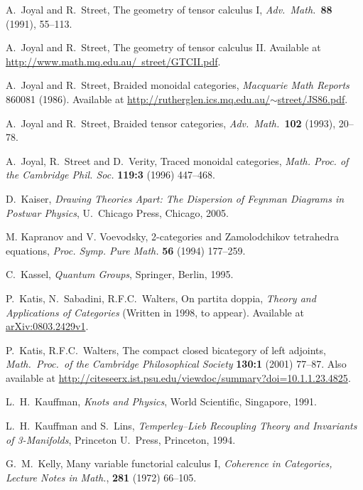 \documentclass[12pt,twoside,openright]{report}
\begin{document}
\begin{thebibliography}{99}
A.\ Joyal and R.\ Street, The geometry of tensor calculus I, 
{\sl Adv.\ Math.\ }{\bf 88} (1991), 55--113.

A.\ Joyal and R.\ Street, The geometry of tensor calculus II. Available at
\hfill \break
\href{http://www.math.mq.edu.au/~street/GTCII.pdf}
{http://www.math.mq.edu.au/~street/GTCII.pdf}.

 A.\ Joyal and R.\ Street, Braided monoidal categories,
{\sl Macquarie Math Reports} 860081 (1986).  Available at
\href{http://rutherglen.ics.mq.edu.au/~street/JS86.pdf}{
http://rutherglen.ics.mq.edu.au/$\sim$street/JS86.pdf}.

A.\ Joyal and R.\ Street, Braided tensor categories,
\textsl{Adv.\ Math.\ }\textbf{102} (1993), 20--78.

 A.\ Joyal, R.\ Street and D.\ Verity, Traced monoidal categories, \textsl{Math. Proc. of the Cambridge Phil. Soc.} \textbf{119:3} (1996) 447--468.

D.\ Kaiser, \textsl{Drawing Theories Apart: The Dispersion of Feynman Diagrams in Postwar Physics}, U.\ Chicago Press, Chicago, 2005.

 M. Kapranov and V. Voevodsky, 2-categories and Zamolodchikov tetrahedra equations, \textsl{Proc. Symp. Pure Math.} \textbf{56} (1994) 177--259.

C.\ Kassel, \textsl{Quantum Groups}, Springer, Berlin, 1995.

 P.\ Katis, N.\ Sabadini, R.F.C.\ Walters, On partita doppia, \textsl{Theory and Applications of Categories} (Written in 1998, to appear).  Available at \href{http://arxiv.org/abs/0803.2429}{arXiv:0803.2429v1}.

 P.\ Katis, R.F.C.\ Walters, The compact closed bicategory of left adjoints, \textsl{Math.\ Proc.\ of the Cambridge Philosophical Society} \textbf{130:1} (2001) 77--87.  Also available at \href{http://citeseerx.ist.psu.edu/viewdoc/summary?doi=10.1.1.23.4825}{http://citeseerx.ist.psu.edu/viewdoc/summary?doi=10.1.1.23.4825}.

L.\ H.\ Kauffman, {\sl Knots and Physics}, World Scientific, Singapore, 1991.

L.\ H.\ Kauffman and S.\ Lins, {\sl Temperley--Lieb Recoupling Theory and Invariants of 3-Manifolds}, Princeton U.\ Press, Princeton, 1994.

 G.\ M.\ Kelly, Many variable functorial calculus I, \textsl{Coherence in Categories, Lecture Notes in Math.}, \textbf{281} (1972) 66--105.


\end{thebibliography}
\end{document}
